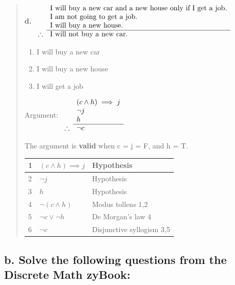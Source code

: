 \documentclass[11pt, oneside]{article}
\begin{document}
\begin{quote}
    \textbf{d. }
    \(
    \begin{array}{rl}
      & \textnormal{I will buy a new car and a new house only if I get a job.} \\
      & \textnormal{I am not going to get a job.} \\
      & \textnormal{I will buy a new house.} \\
      \cline{2-2}
    \therefore & \textnormal{I will not buy a new car.} 
    \end{array}
    \)  
    
    \begin{enumerate}
        \item[c:] I will buy a new car
        \item[h:] I will buy a new house
        \item[j:] I will get a job
    \end{enumerate}
    
    Argument:
    \(
    \begin{array}{rl}
      & (c \land h) \implies j \\
      & \neg j \\
      & h \\
      \cline{2-2}
    \therefore & \neg c  
    \end{array}
    \)  
    
    The argument is \textbf{valid} when c = j = F, and h = T.
    
    \begin{tabular}{|p{0.5cm}|p{5cm}|p{5cm}|}
        \hline
        1 & $(c \land h) \implies j$ & Hypothesis \\
        \hline
        2 & $\neg j$ & Hypothesis \\
        \hline
        3 & $h$ & Hypothesis \\
        \hline
        4 & $\neg (c \land h)$ & Modus tollens 1,2 \\
        \hline
        5 & $\neg c \lor \neg h$ & De Morgan's law 4 \\
        \hline
        6 & $\neg c$ & Disjunctive syllogism 3,5 \\
        \hline
    \end{tabular}
\end{quote}

\subsection*{b. Solve the following questions from the Discrete Math zyBook:}
\end{document}
